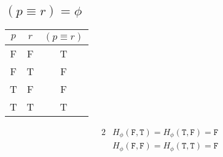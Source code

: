 \documentclass{article}
\begin{document}
\subsection{$(p \equiv r) = \phi$}
\begin{center}
    \begin{NiceTabular}{|c|c|c|}
        \hline
        $p$ & $r$ & $(p \equiv r)$\\
        \hline
        \ttfamily F   &   \ttfamily F  &    \ttfamily  T\\
        \ttfamily F   &   \ttfamily T   &   \ttfamily F\\
        \ttfamily T   &   \ttfamily F   &   \ttfamily F\\
        \ttfamily T   &   \ttfamily T   &   \ttfamily T\\
        \hline
    \end{NiceTabular}
\end{center}
\begin{alignat*}{2}
    & H_{\phi}(\mathtt{F}, \mathtt{T}) = H_{\phi}(\mathtt{T}, \mathtt{F}) = \mathtt{F}\\
    & H_{\phi}(\mathtt{F}, \mathtt{F}) = H_{\phi}(\mathtt{T}, \mathtt{T}) = \mathtt{F}
\end{alignat*}
\end{document}
